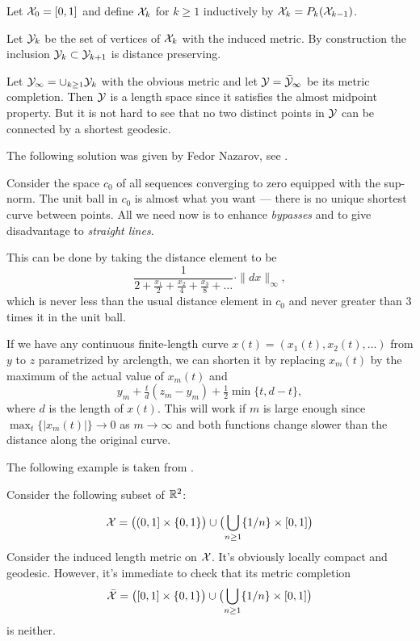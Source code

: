 Let $\mathcal{X}_0=[0,1]$ and define $\mathcal{X}_k$ for $k\ge 1$ inductively by $\mathcal{X}_k=P_k(\mathcal{X}_{k-1})$.

Let $\mathcal{Y}_k$ be the set of vertices of $\mathcal{X}_k$ with the induced metric. By construction the inclusion $\spc{Y}_k\subset \spc{Y}_{k+1}$ is distance preserving.

Let $\spc{Y}_\infty=\cup_{k\ge 1}\spc{Y}_k$ with the obvious metric and let $\mathcal{Y}=\bar {\mathcal{Y}}_\infty$ be its metric completion. Then $\mathcal{Y}$ is a length space since it satisfies the almost midpoint property. But it is not hard to see that no two distinct points in $\mathcal{Y}$ can be connected by a shortest geodesic. \qeds


The following solution was given by Fedor Nazarov, see \cite{nazarov}.

Consider the space $c_0$ of all sequences converging to zero equipped with the sup-norm.
The unit ball in $c_0$ is almost what you want --- there is no unique shortest curve between points. 
All we need now is to enhance {}\emph{bypasses} and to give disadvantage to \emph{straight lines}. 

This can be done by taking the distance element to be 
\[\frac1{2+\frac{x_1}2+\frac{x_2}4+\frac{x_3}8+\dots}\cdot\|dx\|_\infty,\] 
which is never less than the usual distance element in $c_0$ and never greater than 3 times it in the unit ball.

If we have any continuous finite-length curve $x(t)=(x_1(t),x_2(t),\dots)$ from $y$ to $z$ parametrized by arclength, we can shorten it by replacing $x_m(t)$ by the maximum of the actual value of $x_m(t)$ and 
\[y_m+\tfrac td(z_m-y_m)+\tfrac 12 \min\{t,d-t\},\] 
where $d$ is the length of $x(t)$. 
This will work if $m$ is large enough since $\max_t\{|x_m(t)|\}\to 0$ as $m\to\infty$ and both functions change slower than the distance along the original curve.\qeds

The following example is taken from \cite{BH}.

\medskip

Consider the following subset of $\mathbb{R}^2$:

\[
\spc{X}
=
\bigl((0,1]\times\{0,1\}\bigr)
\cup
\bigl(\bigcup_{n\ge 1}\{1/n\}\times[0,1]\bigr)
\]
Consider the induced length metric on $\mathcal{X}$. It's obviously locally compact and geodesic.
However, it's immediate to check that its metric completion \[\bar{\spc{X}}
=
\bigl([0,1]\times\{0,1\}\bigr)
\cup
\bigl(\bigcup_{n\ge 1}\{1/n\}\times[0,1]\bigr)\] 
is neither. \qeds 

